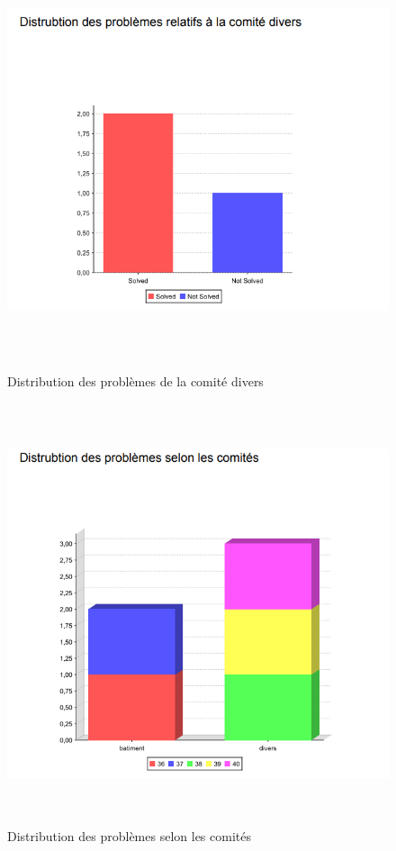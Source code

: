 \documentclass[11.5pt]{report}
\begin{document}
\newpage
\begin{figure}[h]
	
	\begin{center}
		\includegraphics[width=500pt,height=350pt]{d3.png} 
		\caption{Distribution des problèmes de la comité divers}
	\end{center}
	
\end{figure}
\newpage
\begin{figure}[h]
	
	\begin{center}
		\includegraphics[width=500pt,height=350pt]{d2.png} 
		\caption{Distribution des problèmes selon les comités }
	\end{center}
	
\end{figure}
\end{document}
